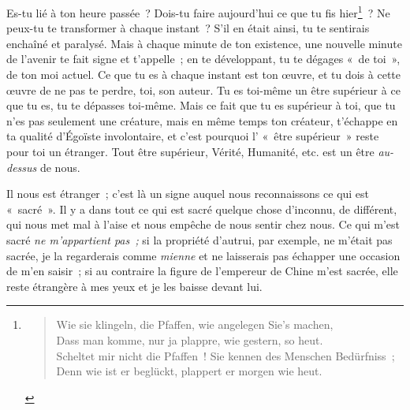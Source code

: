 \documentclass[french,twoside]{book} %
\newcommand{\signed}[1]{\bigbreak\filbreak{\raggedleft #1\par}\medskip}
\begin{document}
 Es-tu lié à ton heure passée ? Dois-tu faire aujourd’hui ce que tu fis hier\footnote{ 
\begin{verse}
Wie sie klingeln, die Pfaffen, wie angelegen Sie’s machen,\\
 Dass man komme, nur ja plappre, wie gestern, so heut.\\
 Scheltet mir nicht die Pfaffen ! Sie kennen des Menschen Bedürfniss ;\\
 Denn wie ist er beglückt, plappert er morgen wie heut.\\
\end{verse}
 

\signed{G{\scshape œthe}, \emph{(Épigrammes vénitiennes, 11).}}
 } ? Ne peux-tu te transformer à chaque instant ? S’il en était ainsi, tu te sentirais enchaîné et paralysé. Mais à chaque minute de ton existence, une nouvelle minute de l’avenir te fait signe et t’appelle ; en te développant, tu te dégages « de toi », de ton moi actuel. Ce que tu es à chaque instant est ton œuvre, et tu dois à cette œuvre de ne pas te perdre, toi, son auteur. Tu es toi-même un être supérieur à ce que tu es, tu te dépasses toi-même. Mais ce fait que tu es supérieur à toi, que tu n’es pas seulement une créature, mais en même temps ton créateur, t’échappe en ta qualité d’Égoïste involontaire, et c’est pourquoi l’ « être supérieur » reste pour toi un étranger. Tout être supérieur, Vérité, Humanité, etc. est un être \emph{au-dessus} de nous.\par
Il nous est étranger ; c’est là un signe auquel nous reconnaissons ce qui est « sacré ». Il y a dans tout ce qui est sacré quelque chose d’inconnu, de différent, qui nous met mal à l’aise et nous empêche de nous sentir chez nous. Ce qui m’est sacré \emph{ne m’appartient pas ;} si la propriété d’autrui, par exemple, ne m’était pas sacrée, je la regarderais comme \emph{mienne} et ne laisserais pas échapper une occasion de m’en saisir ; si au contraire la figure de l’empereur de Chine m’est sacrée, elle reste étrangère à mes yeux et je les baisse devant lui.\par
\end{document}
